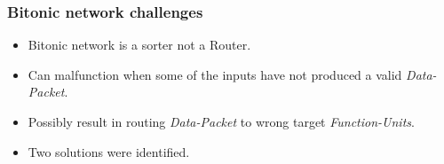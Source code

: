 \begin{frame}
\frametitle{Bitonic network challenges}
 \begin{itemize}
    \item Bitonic network is a sorter not a Router.\\
    \item Can malfunction when some of the inputs have not produced a valid \textit{Data-Packet}. \\
    \item Possibly result in routing \textit{Data-Packet} to wrong target \textit{Function-Units}. \\
    \item Two solutions were identified.\\
  \end{itemize}
\end{frame}
